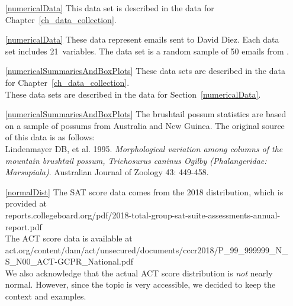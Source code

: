 \begin{itemize}

\item[\ref{numericalData}]
    This data set is described in
    the data for Chapter~\ref{ch_data_collection}.

\item[\ref{numericalData}]
    These data represent emails sent to David Diez.
    Each data set includes 21~variables.
    The  data set is a random sample
    of 50 emails from .

\item[\ref{numericalSummariesAndBoxPlots}]
    These data sets are described in
    the data for Chapter~\ref{ch_data_collection}. \\
    These data sets are described in
    the data for Section~\ref{numericalData}.

\item[\ref{numericalSummariesAndBoxPlots}]
    The brushtail possum statistics are based on a sample
    of possums from Australia and New Guinea.
    The original source of this data is as follows:\\
    Lindenmayer DB, et al. 1995.
    \emph{Morphological variation among columns of the
        mountain brushtail possum, Trichosurus caninus
        Ogilby (Phalangeridae: Marsupiala)}.
    Australian Journal of Zoology 43: 449-458.

\item[\ref{normalDist}]
    The SAT score data comes from the 2018 distribution,
    which is provided at \\
    {\small
        {reports.collegeboard.org/pdf/2018-total-group-sat-suite-assessments-annual-report.pdf}} \\
    The ACT score data is available at \\
    {\footnotesize
        {act.org/content/dam/act/unsecured/documents/cccr2018/P\_99\_999999\_N\_S\_N00\_ACT-GCPR\_National.pdf}} \\
    We also acknowledge that the actual ACT score distribution
    is \emph{not} nearly normal.
    However, since the topic is very accessible,
    we decided to keep the context and examples.


\end{itemize}
